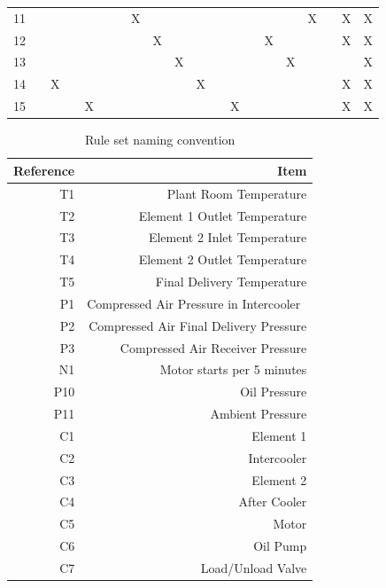 \begin{table}[htbp]
\begin{tabular}{rrrrrrrrrrrrrrrrrp{}p{}p{}}
    11    &       &       &       &       &       &       & X     &       &       &       &       &       &       &       &       & X     &       & X     & X \\
    12    &       &       &       &       &       &       &       & X     &       &       &       &       &       & X     &       &       &       & X     & X \\
    13    &       &       &       &       &       &       &       &       & X     &       &       &       &       &       & X     &       &       &       & X \\
    14    &       & X     &       &       &       &       &       &       &       & X     &       &       &       &       &       &       &       & X     & X \\
    15    &       &       &       & X     &       &       &       &       &       &       &       & X     &       &       &       &       &       & X     & X \\
    \bottomrule
    \end{tabular}%
  \label{tab:addlabel}%
\end{table}%



\lipsum[1-10]


\begin{table}[htbp]
  \centering
  \caption{Rule set naming convention}
    \begin{tabular}{rr}
    \toprule
    Reference & Item \\
    \midrule
    T1    & Plant Room Temperature \\
    T2    & Element 1 Outlet Temperature \\
    T3    & Element 2 Inlet Temperature \\
    T4    & Element 2 Outlet Temperature \\
    T5    & Final Delivery Temperature \\
    P1    & Compressed Air Pressure in Intercooler  \\
    P2    & Compressed Air Final Delivery Pressure \\
    P3    & Compressed Air Receiver Pressure \\
    N1    & Motor starts per 5 minutes \\
    P10   & Oil Pressure \\
    P11   & Ambient Pressure \\
    C1    & Element 1 \\
    C2    & Intercooler \\
    C3    & Element 2 \\
    C4    & After Cooler \\
    C5    & Motor \\
    C6    & Oil Pump \\
    C7    & Load/Unload Valve \\
    \bottomrule
    \end{tabular}%
  \label{tab:namingconvention}%
\end{table}%




